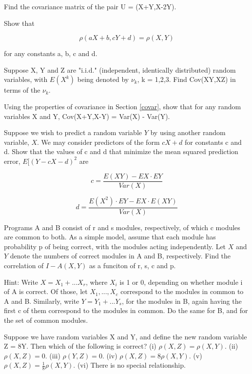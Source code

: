 Find the covariance matrix of the pair U = (X+Y,X-2Y).

\oneproblem
Show that

\begin{equation}
\rho(aX+b,cY+d) = \rho(X,Y)
\end{equation}

for any constants a, b, c and d.

\oneproblem
Suppose X, Y and Z are "i.i.d." (independent, identically distributed)
random variables, with $E(X^k)$ being denoted by $\nu_k$, k = 1,2,3.
Find Cov(XY,XZ) in terms of the $\nu_k$.

\oneproblem
Using the properties of covariance in Section \ref{covar}, show that
for any random variables X and Y, Cov(X+Y,X-Y) = Var(X) - Var(Y).

\oneproblem
Suppose we wish to predict a random variable $Y$ by using another random
variable, $X$.  We may consider predictors of the form $cX+d$ for
constants c and d.  Show that the values of c and d that minimize
the mean squared prediction error, $E[(Y- cX - d)^2$ are

\begin{equation}
c = \frac{E(XY) - EX \cdot EY}{Var(X)}
\end{equation}

\begin{equation}
d = \frac{E(X^2) \cdot EY - EX \cdot E(XY)}{Var(X)}
\end{equation}

\oneproblem
Programs A and B consist of r and s modules, respectively, of which c
modules are common to both. As a simple model, assume that each module
has probability p of being correct, with the modules acting
independently. Let $X$ and $Y$ denote the numbers of correct modules in
A and B, respectively.  Find the correlation of $I-A(X,Y)$ as a funciton
of r, s, c and p.

Hint:  Write $X = X_1+...X_r$, where $X_i$ is 1 or 0, depending on
whether module i of A is correct.   Of those, let $X_1,...,X_c$
correspond to the modules in common to A and B.  Similarly, write $Y =
Y_1+...Y_s$, for the modules in B, again having the first c of them
correspond to the modules in common.  Do the same for B, and for the set
of common modules.

\oneproblem
Suppose we have random variables X and Y, and define the new
random variable Z = 8Y.  Then which of the following is correct?
(i) $\rho(X,Z) = \rho(X,Y)$.  (ii) $\rho(X,Z) =
0$. (iii) $\rho(Y,Z) = 0$.  (iv) $\rho(X,Z) = 8 \rho(X,Y)$.  (v)
$\rho(X,Z) = \frac{1}{8} \rho(X,Y)$. (vi) There is no special
relationship.

